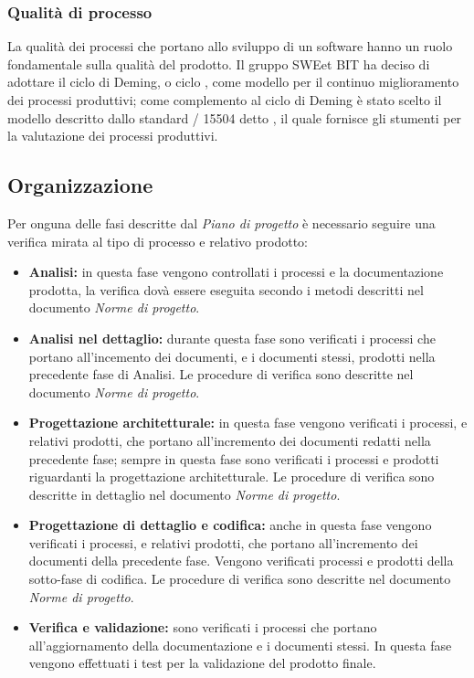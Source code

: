     \subsubsection{Qualità di processo}
    La qualità dei processi che portano allo sviluppo di un software hanno un ruolo fondamentale sulla qualità del prodotto.
    Il gruppo SWEet BIT ha deciso di adottare il ciclo di Deming, o ciclo , come modello per il continuo miglioramento dei processi produttivi;
    come complemento al ciclo di Deming è stato scelto il modello descritto dallo standard / 15504 detto ,
    il quale fornisce gli stumenti per la valutazione dei processi produttivi.

  \subsection{Organizzazione}
    Per onguna delle fasi descritte dal \emph{Piano di progetto} è necessario seguire una verifica mirata al tipo di processo e relativo prodotto:
    \begin{itemize}
      \item \textbf{Analisi:} in questa fase vengono controllati i processi e la documentazione prodotta,
      la verifica dovà essere eseguita secondo i metodi descritti nel documento \emph{Norme di progetto}.
      \item \textbf{Analisi nel dettaglio:} durante questa fase sono verificati i processi che portano all'incemento dei documenti, e i documenti stessi, prodotti nella precedente fase di Analisi.
      Le procedure di verifica sono descritte nel documento \emph{Norme di progetto}.
      \item \textbf{Progettazione architetturale:} in questa fase vengono verificati i processi, e relativi prodotti, che portano all'incremento dei documenti redatti nella precedente fase;
      sempre in questa fase sono verificati i processi e prodotti riguardanti la progettazione architetturale.
      Le procedure di verifica sono descritte in dettaglio nel documento \emph{Norme di progetto}.
      \item \textbf{Progettazione di dettaglio e codifica:} anche in questa fase vengono verificati i processi, e relativi prodotti, che portano all'incremento dei documenti della precedente fase.
      Vengono verificati processi e prodotti della sotto-fase di codifica. Le procedure di verifica sono descritte nel documento \emph{Norme di progetto}.
      \item \textbf{Verifica e validazione:} sono verificati i processi che portano all'aggiornamento della documentazione e i documenti stessi.
      In questa fase vengono effettuati i test per la validazione del prodotto finale.
    \end{itemize}

